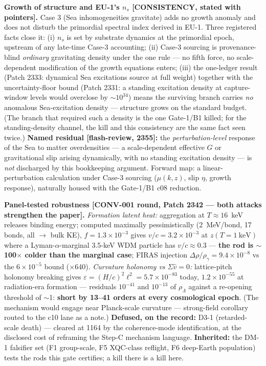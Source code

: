 \documentclass[11pt]{article}
\newcommand{\rL}{\rho_\Lambda}
\begin{document}
\textbf{Growth of structure and EU-1's $n_s$ [CONSISTENCY, stated with pointers].} Case 3 (Sea
inhomogeneities gravitate) adds no growth anomaly and does not disturb the primordial spectral index
derived in EU-1. Three registered facts close it: (i) $n_s$ is set by substrate dynamics at the
primordial epoch, upstream of any late-time Case-3 accounting; (ii) Case-3 sourcing is
provenance-blind \emph{ordinary} gravitating density under the one rule --- no fifth force, no
scale-dependent modification of the growth equations enters; (iii) the one-ledger result (Patch 2333:
dynamical Sea excitations source at full weight) together with the uncertainty-floor bound (Patch
2331: a standing excitation density at capture-window levels would overclose by $\sim10^{34}$) means
the surviving branch carries \emph{no} anomalous Sea-excitation density --- structure grows on the
standard budget. (The branch that required such a density is the one Gate-1/B1 killed; for the
standing-density channel, the kill and this consistency are the same fact seen twice.)
\textbf{Named residual [flash-review, 2355]:} the \emph{perturbation-level} response of the Sea to
matter overdensities --- a scale-dependent effective $G$ or gravitational slip arising dynamically,
with no standing excitation density --- is \emph{not} discharged by this bookkeeping argument.
Forward map: a linear-perturbation calculation under Case-3 sourcing ($\mu(k,z)$, slip $\eta$,
growth response), naturally housed with the Gate-1/B1 c08 reduction.

\textbf{Panel-tested robustness [CONV-001 round, Patch 2342 --- both attacks strengthen the paper].}
\emph{Formation latent heat:} aggregation at $T\approx16$~keV releases binding energy; computed
maximally pessimistically (2~MeV/bond, 17 bonds, all $\to$ bulk KE), $f = 1.3\times10^{-3}$ gives
$v/c = 3.2\times10^{-3}$ at $z(T=1~\mathrm{keV})$ where a Lyman-$\alpha$-marginal 3.5-keV WDM
particle has $v/c\approx0.3$ --- \textbf{the rod is $\sim$100$\times$ colder than the marginal case};
FIRAS injection $\Delta\rho/\rho_\gamma = 9.4\times10^{-8}$ vs the $6\times10^{-5}$ bound
($\times$640). \emph{Curvature holonomy vs $\Sigma\hat v = 0$:} lattice-pitch holonomy breaking gives
$\varepsilon = (H/c)^2\ell^2 = 5.7\times10^{-83}$ today, $1.2\times10^{-55}$ at radiation-era
formation --- residuals $10^{-41}$ and $10^{-13}$ of $\rL$ against a re-opening threshold of
$\sim$1: \textbf{short by 13--41 orders at every cosmological epoch}. (The mechanism would engage
near Planck-scale curvature --- strong-field corollary routed to the c10 lane as a note.)
\textbf{Defused, on the record:} D3-1 (retarded-scale death) --- cleared at 1164 by the
coherence-mode identification, at the disclosed cost of reframing the Step-C mechanism language.
\textbf{Inherited:} the DM-1 falsifier set (F1 group-scale, F5 XQC-class reflight, F6 deep-Earth
population) tests the rods this gate certifies; a kill there is a kill here.
\end{document}
